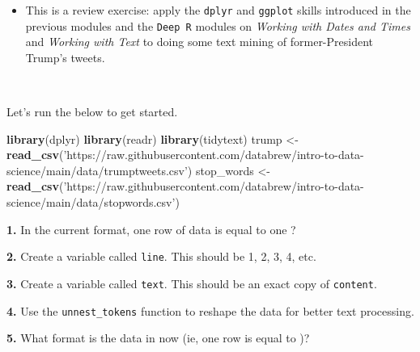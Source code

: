 \documentclass[]{book}
\newenvironment{Shaded}{\begin{snugshade}}{\end{snugshade}}
\newcommand{\KeywordTok}[1]{\textcolor[rgb]{0.13,0.29,0.53}{\textbf{#1}}}
\newcommand{\NormalTok}[1]{#1}
\newcommand{\OperatorTok}[1]{\textcolor[rgb]{0.81,0.36,0.00}{\textbf{#1}}}
\newcommand{\StringTok}[1]{\textcolor[rgb]{0.31,0.60,0.02}{#1}}
\providecommand{\tightlist}{%
  \setlength{\itemsep}{0pt}\setlength{\parskip}{0pt}}
\begin{document}
\begin{itemize}
\tightlist
\item
  This is a review exercise: apply the \texttt{dplyr} and \texttt{ggplot} skills introduced in the previous modules and the \texttt{Deep\ R} modules on \emph{Working with Dates and Times} and \emph{Working with Text} to doing some text mining of former-President Trump's tweets.
\end{itemize}

~

Let's run the below to get started.

\begin{Shaded}
\begin{Highlighting}[]
\KeywordTok{library}\NormalTok{(dplyr)}
\KeywordTok{library}\NormalTok{(readr)}
\KeywordTok{library}\NormalTok{(tidytext)}
\NormalTok{trump <-}\StringTok{ }\KeywordTok{read_csv}\NormalTok{(}\StringTok{'https://raw.githubusercontent.com/databrew/intro-to-data-science/main/data/trumptweets.csv'}\NormalTok{)}
\NormalTok{stop_words <-}\StringTok{ }\KeywordTok{read_csv}\NormalTok{(}\StringTok{'https://raw.githubusercontent.com/databrew/intro-to-data-science/main/data/stopwords.csv'}\NormalTok{)}
\end{Highlighting}
\end{Shaded}

\textbf{1.} In the current format, one row of data is equal to one ?

\textbf{2.} Create a variable called \texttt{line}. This should be 1, 2, 3, 4, etc.

\textbf{3.} Create a variable called \texttt{text}. This should be an exact copy of \texttt{content}.

\textbf{4.} Use the \texttt{unnest\_tokens} function to reshape the data for better text processing.

\begin{Shaded}
\end{Shaded}

\textbf{5.} What format is the data in now (ie, one row is equal to )?
\end{document}
